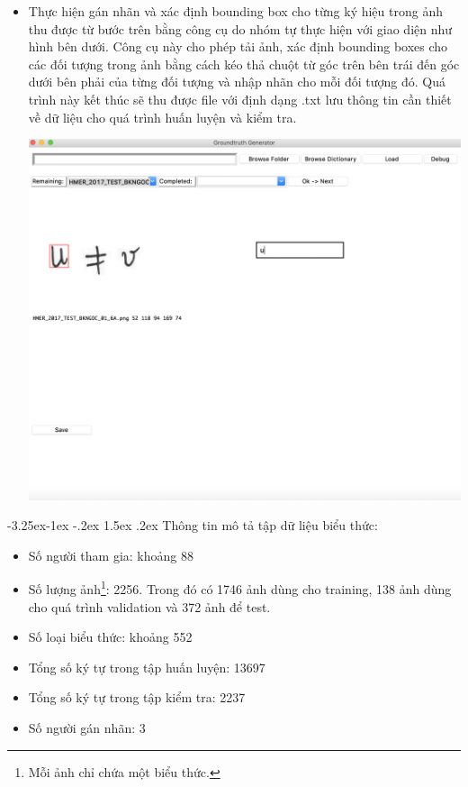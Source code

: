 \documentclass[a4paper,12pt]{article}
\makeatletter
\newcounter {subsubsubsection}[subsubsection]
\newcommand\subsubsubsection{\@startsection{subsubsubsection}{4}{\z@}%
	{-3.25ex\@plus -1ex \@minus -.2ex}%
	{1.5ex \@plus .2ex}%
	{\normalfont\normalsize\bfseries}}
\makeatother
\begin{document}
\begin{itemize}
\begin{center}
			\vspace{0.5cm}
		\end{center}
		\item Thực hiện gán nhãn và xác định bounding box cho từng ký hiệu trong ảnh thu được từ bước trên bằng công cụ do nhóm tự thực hiện với giao diện như hình bên dưới. Công cụ này cho phép tải ảnh, xác định bounding boxes cho các đối tượng trong ảnh bằng cách kéo thả chuột từ góc trên bên trái đến góc dưới bên phải của từng đối tượng và nhập nhãn cho mỗi đối tượng đó. Quá trình này kết thúc sẽ thu được file với định dạng .txt lưu thông tin cần thiết về dữ liệu cho quá trình huấn luyện và kiểm tra. 
		\begin{center}
			\centering
			\includegraphics[width=0.65\linewidth]{tool}
			\vspace{0.5cm}
		\end{center}
	\end{itemize}
	\subsubsubsection{Thông tin mô tả tập dữ liệu biểu thức:}
	\begin{itemize}
		\item Số người tham gia: khoảng 88 
		\item Số lượng ảnh\footnote{Mỗi ảnh chỉ chứa một biểu thức.}:  2256. Trong đó có 1746 ảnh dùng cho training, 138 ảnh dùng cho quá trình validation và 372 ảnh để test.
		\item Số loại biểu thức: khoảng 552
		\item Tổng số ký tự trong tập huấn luyện: 13697
		\item Tổng số ký tự trong tập kiểm tra: 2237
		\item Số  người gán nhãn: 3
	\end{itemize}
\end{document}
